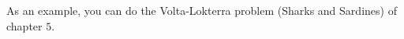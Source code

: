 As an example, you can do the Volta-Lokterra problem (Sharks and Sardines) of chapter $5$.





















